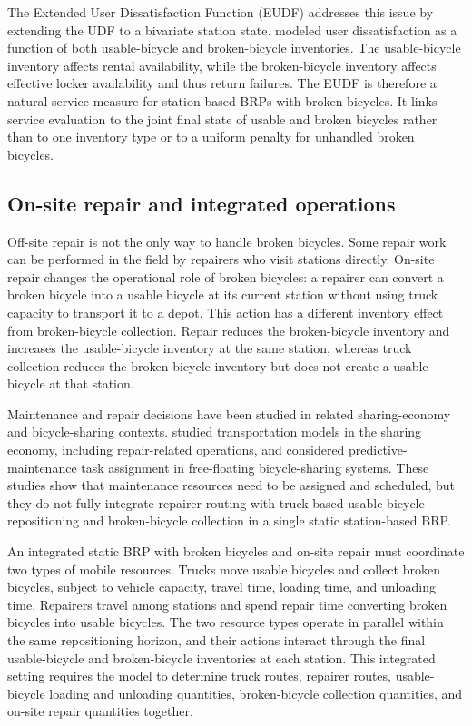 The Extended User Dissatisfaction Function (EUDF) addresses this issue by extending the UDF to a bivariate station state. \citet{kaspiBikesharingSystemsUser2017} modeled user dissatisfaction as a function of both usable-bicycle and broken-bicycle inventories. The usable-bicycle inventory affects rental availability, while the broken-bicycle inventory affects effective locker availability and thus return failures. The EUDF is therefore a natural service measure for station-based BRPs with broken bicycles. It links service evaluation to the joint final state of usable and broken bicycles rather than to one inventory type or to a uniform penalty for unhandled broken bicycles.

\subsection{On-site repair and integrated operations}

Off-site repair is not the only way to handle broken bicycles. Some repair work can be performed in the field by repairers who visit stations directly. On-site repair changes the operational role of broken bicycles: a repairer can convert a broken bicycle into a usable bicycle at its current station without using truck capacity to transport it to a depot. This action has a different inventory effect from broken-bicycle collection. Repair reduces the broken-bicycle inventory and increases the usable-bicycle inventory at the same station, whereas truck collection reduces the broken-bicycle inventory but does not create a usable bicycle at that station.

Maintenance and repair decisions have been studied in related sharing-economy and bicycle-sharing contexts. \citet{freundModelsAlgorithmsTransportation2018} studied transportation models in the sharing economy, including repair-related operations, and \citet{luTaskAssignmentPredictive2022} considered predictive-maintenance task assignment in free-floating bicycle-sharing systems. These studies show that maintenance resources need to be assigned and scheduled, but they do not fully integrate repairer routing with truck-based usable-bicycle repositioning and broken-bicycle collection in a single static station-based BRP.

An integrated static BRP with broken bicycles and on-site repair must coordinate two types of mobile resources. Trucks move usable bicycles and collect broken bicycles, subject to vehicle capacity, travel time, loading time, and unloading time. Repairers travel among stations and spend repair time converting broken bicycles into usable bicycles. The two resource types operate in parallel within the same repositioning horizon, and their actions interact through the final usable-bicycle and broken-bicycle inventories at each station. This integrated setting requires the model to determine truck routes, repairer routes, usable-bicycle loading and unloading quantities, broken-bicycle collection quantities, and on-site repair quantities together.

